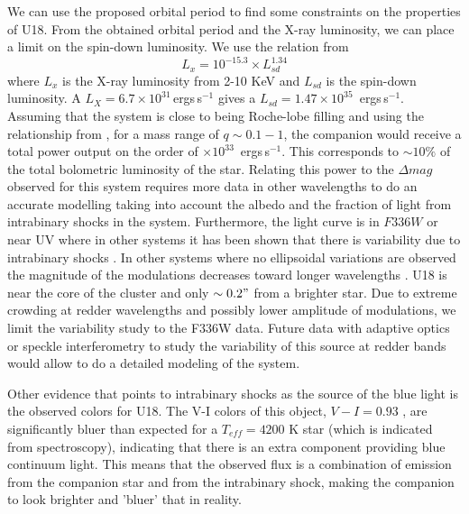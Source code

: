 \documentclass[fleqn,usenatbib,useAMS,letters]{mnras}
\newcommand{\ergs}{\,ergs\,s$^{-1}$} %
\begin{document}
 We can use the proposed orbital period to find some constraints on the properties of U18. From the obtained orbital period and the X-ray luminosity, we can place a limit on the spin-down luminosity. We use the relation from \cite{Possenti2002} $$L_x = 10^{-15.3} \times L_{sd}^{1.34} $$ where $L_x$ is the X-ray luminosity from 2-10 KeV and $L_{sd}$ is the spin-down luminosity. A $L_X= 6.7 \times 10 ^{31}$\ergs \citep[0.3-8 keV;][]{bogdanov_chandra_2010} gives a $L_{sd} = 1.47\times 10 ^{35}$ \ergs. Assuming that the system is close to being Roche-lobe filling and using the relationship from \cite{EggletonRoche1983}, for a mass range of $q\sim0.1-1$, the companion would receive a total power output on the order of $\times 10^{33}$ \ergs. This corresponds to $\sim 10 \%$ of the total bolometric luminosity of the star. Relating this power to the $\Delta mag$ observed for this system requires more data in other wavelengths to do an accurate modelling taking into account the albedo and the fraction of light from intrabinary shocks in the system. Furthermore, the light curve is in $F336W$ or near UV where in other systems it has been shown that there is variability due to intrabinary shocks \cite[e.g.][]{Liliana201847Tuc}. In other systems where no ellipsoidal variations are observed the magnitude of the modulations decreases toward longer wavelengths \cite[e.g.][]{Baglio2016}. U18 is near the core of the cluster and only $\sim 0.2"$ from a brighter star. Due to extreme crowding at redder wavelengths and possibly lower amplitude of modulations, we limit the variability study to the F336W data. Future data with adaptive optics or speckle interferometry to study the variability of this source at redder bands would allow to do a detailed modeling of the system. 
 
Other evidence that points to intrabinary shocks as the source of the blue light is the observed colors for U18. The V-I colors of this object, $V-I = 0.93$ \citep{Pallanca2017Halpha}, are significantly bluer than expected for a $T_{eff}=4200$ K star \citep{Mamajek2013} (which is indicated from spectroscopy), indicating that there is an extra component providing blue continuum light. This means that the observed flux is a combination of emission from the companion star and from the intrabinary shock, making the companion to look brighter and ’bluer’ that in reality.
\end{document}
